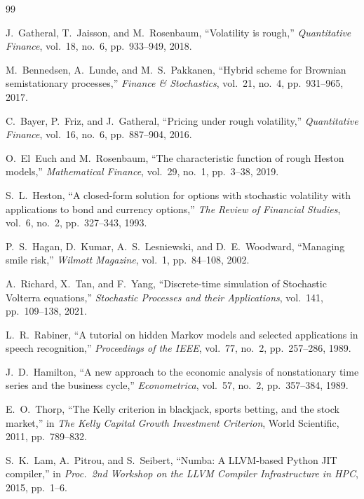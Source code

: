 \documentclass[conference]{IEEEtran}
\begin{document}
\begin{thebibliography}{99}

J.~Gatheral, T.~Jaisson, and M.~Rosenbaum,
``Volatility is rough,''
\textit{Quantitative Finance}, vol.~18, no.~6, pp.~933--949, 2018.

M.~Bennedsen, A.~Lunde, and M.~S.~Pakkanen,
``Hybrid scheme for Brownian semistationary processes,''
\textit{Finance \& Stochastics}, vol.~21, no.~4, pp.~931--965, 2017.

C.~Bayer, P.~Friz, and J.~Gatheral,
``Pricing under rough volatility,''
\textit{Quantitative Finance}, vol.~16, no.~6, pp.~887--904, 2016.

O.~El~Euch and M.~Rosenbaum,
``The characteristic function of rough Heston models,''
\textit{Mathematical Finance}, vol.~29, no.~1, pp.~3--38, 2019.

S.~L.~Heston,
``A closed-form solution for options with stochastic volatility with
  applications to bond and currency options,''
\textit{The Review of Financial Studies}, vol.~6, no.~2, pp.~327--343,
1993.

P.~S.~Hagan, D.~Kumar, A.~S.~Lesniewski, and D.~E.~Woodward,
``Managing smile risk,''
\textit{Wilmott Magazine}, vol.~1, pp.~84--108, 2002.

A.~Richard, X.~Tan, and F.~Yang,
``Discrete-time simulation of Stochastic Volterra equations,''
\textit{Stochastic Processes and their Applications},
vol.~141, pp.~109--138, 2021.

L.~R.~Rabiner,
``A tutorial on hidden Markov models and selected applications in speech
  recognition,''
\textit{Proceedings of the IEEE}, vol.~77, no.~2, pp.~257--286, 1989.

J.~D.~Hamilton,
``A new approach to the economic analysis of nonstationary time series
  and the business cycle,''
\textit{Econometrica}, vol.~57, no.~2, pp.~357--384, 1989.

E.~O.~Thorp,
``The Kelly criterion in blackjack, sports betting, and the stock
  market,''
in \textit{The Kelly Capital Growth Investment Criterion},
World Scientific, 2011, pp.~789--832.

S.~K.~Lam, A.~Pitrou, and S.~Seibert,
``Numba: A LLVM-based Python JIT compiler,''
in \textit{Proc.\ 2nd Workshop on the LLVM Compiler Infrastructure
in HPC}, 2015, pp.~1--6.

\end{thebibliography}
\end{document}
